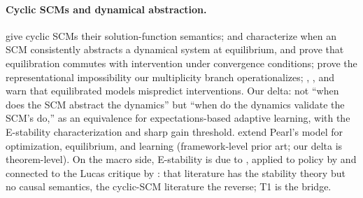 \documentclass[pmlr]{jmlr}
\newcommand{\doop}{\mathrm{do}}
\begin{document}
\paragraph{Cyclic SCMs and dynamical abstraction.}  \citet{bongers2021foundations}
give cyclic SCMs their solution-function semantics; \citet{mooij2013ordinary} and \citet{rubenstein2017causal}
characterize when an SCM consistently abstracts a dynamical system at equilibrium, and
\citet{bongers2018causal} prove that equilibration commutes with intervention under convergence
conditions; \citet{blom2019beyond} prove the representational impossibility our multiplicity
branch operationalizes; \citet{iwasaki1994causality}, \citet{dash2005restructuring}, and
\citet{weinberger2023intervening} warn that equilibrated models mispredict interventions. Our
delta: not ``when does the SCM abstract the dynamics'' but ``when do the dynamics validate the
SCM's $\doop$,'' as an equivalence for expectations-based adaptive learning, with the
E-stability characterization and sharp gain threshold. \citet{white2009settable} extend Pearl's
model for optimization, equilibrium, and learning (framework-level prior art; our delta is
theorem-level). On the macro side, E-stability is due to
\citet{marcet1989convergence,evans2001learning}, applied to policy by \citet{bullard2002learning}
and connected to the Lucas critique by \citet{evans2006adaptive}: that literature has the
stability theory but no causal semantics, the cyclic-SCM literature the reverse; T1 is the
bridge.
\end{document}
